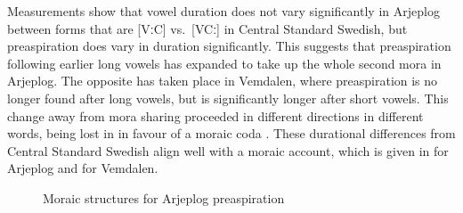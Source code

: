 \documentclass[output=paper,colorlinks,citecolor=brown]{langscibook}
\begin{document}
Measurements show that vowel duration does not vary significantly in Arjeplog between forms that are [VːC] vs.\ [VCː] in Central Standard Swedish, but preaspiration does vary in duration significantly. This suggests that preaspiration following earlier long vowels has expanded to take up the whole second mora in Arjeplog. The opposite has taken place in Vemdalen, where preaspiration is no longer found after long vowels, but is significantly longer after short vowels. This change away from mora sharing proceeded in different directions in different words, being lost in  in favour of a moraic coda \citep{wretlingetal2002}. These durational differences from Central Standard Swedish align well with a moraic account, which is given in  for Arjeplog and  for Vemdalen.

\begin{figure}
\caption{Moraic structures for Arjeplog preaspiration}
\label{ex-swedish-arjeplog-moraic}
\hspace{3em}
\end{figure}
\end{document}
